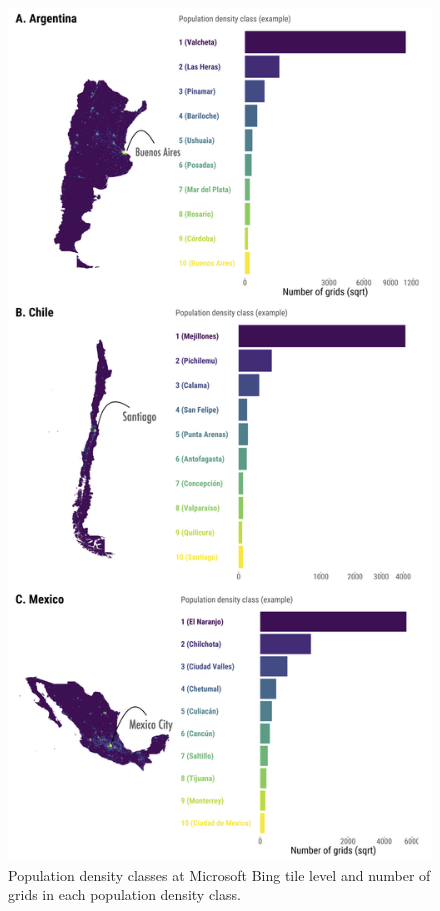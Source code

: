 \documentclass[
  11pt,
]{article}
\begin{document}
\begin{figure}

{\centering \includegraphics{../outputs/density-maps/composite_density-maps2.png}

}

\caption{\label{fig-map}Population density classes at Microsoft Bing
tile level and number of grids in each population density class.}

\end{figure}
\end{document}
